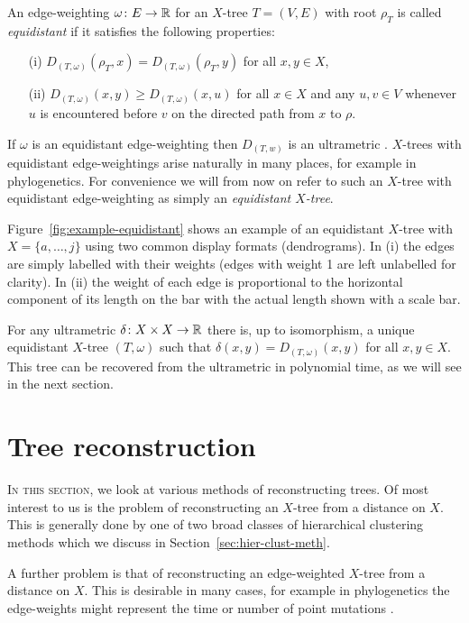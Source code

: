 An edge-weighting $\omega \colon E \to {\mathbb R}$ for an $X$-tree $T=(V,E)$ with
root $\rho_T$ is called \textit{equidistant} if it satisfies the following
properties:
\begin{itemize}
\item[(i)] $D_{(T,\omega)}(\rho_T,x) = D_{(T,\omega)}(\rho_T,y)$ for all $x,y
  \in X$,
\item[(ii)] $D_{(T,\omega)}(x,y) \geq D_{(T,\omega)}(x,u)$ for all $x \in X$
  and any $u,v \in V$ whenever $u$ is encountered before $v$ on the directed
  path from $x$ to $\rho$.
\end{itemize}
If $\omega$ is an equidistant edge-weighting then $D_{(T,w)}$ is an
ultrametric \cite[Lemma 7.2.4]{semple2003phylogenetics}.  $X$-trees with
equidistant edge-weightings arise naturally in many places, for example in
phylogenetics.  For convenience we will from now on refer to such an $X$-tree
with equidistant edge-weighting as simply an \textit{equidistant $X$-tree}.

Figure~\ref{fig:example-equidistant} shows an example of an equidistant
$X$-tree with $X = \{a, \dotsc, j\}$ using two common display formats
(dendrograms).  In (i) the edges are simply labelled with their weights (edges
with weight 1 are left unlabelled for clarity).  In (ii) the weight of each
edge is proportional to the horizontal component of its length on the bar with
the actual length shown with a scale bar.

For any ultrametric $\delta \colon X \times X \to {\mathbb R}$ there is, up to
isomorphism, a unique equidistant $X$-tree $(T,\omega)$ such that $\delta(x,y)
= D_{(T,\omega)}(x,y)$ for all $x,y \in X$.  This tree can be recovered from
the ultrametric in polynomial time, as we will see in the next section.

\section{Tree reconstruction}
\label{sec:tree-construction}

\textsc{In this section}, we look at various methods of reconstructing trees.
Of most interest to us is the problem of reconstructing an $X$-tree from a
distance on $X$.  This is generally done by one of two broad classes of
hierarchical clustering methods which we discuss in
Section~\ref{sec:hier-clust-meth}.

A further problem is that of reconstructing an edge-weighted $X$-tree from a
distance on $X$.  This is desirable in many cases, for example in
phylogenetics the edge-weights might represent the time or number of point
mutations \cite{felsenstein2004inferring}.

